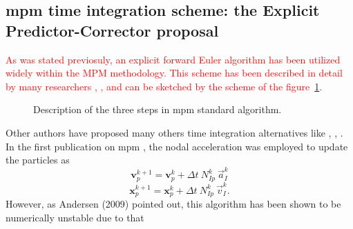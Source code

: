 \documentclass[preprint,12pt,a4paper]{elsarticle}
\newcommand{\vect}[1]{
  \ensuremath{\mathbf{{#1}}}
}
\newcommand{\red}[1]{
  \textcolor{red}{{#1}}
}
\begin{document}
\subsection{\acrshort{mpm} time integration scheme: the Explicit Predictor-Corrector proposal}
\label{sec:epc-algor-mpm}

\red{As was stated previosuly, an explicit forward Euler algorithm has been utilized widely within the \acrshort{MPM} methodology. This scheme has been described in detail by many researchers
\cite{Sulsky1994}, \cite{Bardenhagen2002}, \cite{thesis_Andersen_2009} and can be sketched by the scheme of the figure~\ref{fig:MPM_algorithm}.}
\begin{figure}\sidecaption
  \centering
  \caption{Description of the three steps in \acrshort{mpm} standard algorithm.}
  \label{fig:MPM_algorithm}
\end{figure}
Other authors have proposed many others time integration alternatives
like \cite{Guilkey2003}, \cite{Tran2019e}, \cite{Charlton2017}. In the
first publication on \acrshort{mpm} \cite{Sulsky1994}, the nodal acceleration
was employed to update the particles as
\begin{equation}
  \label{eq:Sulsky-1994-UL-v}
  \vect{v}_p^{k+1} = \vect{v}_p^{k} + \Delta t\ N_{Ip}^{k}\ \vec{a}_{I}^{k}
\end{equation}
\begin{equation}
  \label{eq:Sulsky-1994-UL-x}
  \vect{x}_p^{k+1} = \vect{x}_p^{k} + \Delta t\ N_{Ip}^{k}\ \vec{v}_{I}^{k}.
\end{equation}
However, as Andersen (2009)\cite{thesis_Andersen_2009} pointed out, this algorithm has been shown to be numerically unstable due to that
\end{document}
